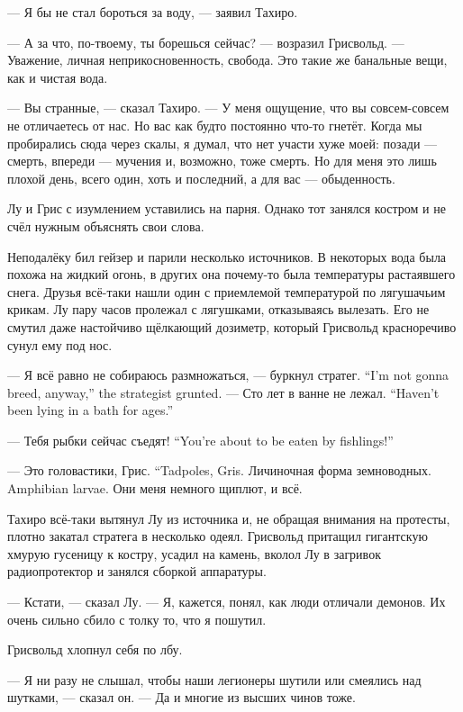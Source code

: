 --- Я бы не стал бороться за воду, --- заявил Тахиро.

--- А за что, по-твоему, ты борешься сейчас? --- возразил Грисвольд.
--- Уважение, личная неприкосновенность, свобода.
Это такие же банальные вещи, как и чистая вода.

--- Вы странные, --- сказал Тахиро.
--- У меня ощущение, что вы совсем-совсем не отличаетесь от нас.
Но вас как будто постоянно что-то гнетёт.
Когда мы пробирались сюда через скалы, я думал, что нет участи хуже моей: позади --- смерть, впереди --- мучения и, возможно, тоже смерть.
Но для меня это лишь плохой день, всего один, хоть и последний, а для вас --- обыденность.

Лу и Грис с изумлением уставились на парня.
Однако тот занялся костром и не счёл нужным объяснять свои слова.

\asterism

Неподалёку бил гейзер и парили несколько источников.
В некоторых вода была похожа на жидкий огонь, в других она почему-то была температуры растаявшего снега.
Друзья всё-таки нашли один с приемлемой температурой по лягушачьим крикам.
Лу пару часов пролежал с лягушками, отказываясь вылезать.
Его не смутил даже настойчиво щёлкающий дозиметр, который Грисвольд красноречиво сунул ему под нос.

{--- Я всё равно не собираюсь размножаться, --- буркнул стратег.}
{``I'm not gonna breed, anyway,'' the strategist grunted.}
{--- Сто лет в ванне не лежал.}
{``Haven't been lying in a bath for ages.''}

{--- Тебя рыбки сейчас съедят!}
{``You're about to be eaten by fishlings!''}

{--- Это головастики, Грис.}
{``Tadpoles, Gris.}
{Личиночная форма земноводных.}
{Amphibian larvae.}
Они меня немного щиплют, и всё.

Тахиро всё-таки вытянул Лу из источника и, не обращая внимания на протесты, плотно закатал стратега в несколько одеял.
Грисвольд притащил гигантскую хмурую гусеницу к костру, усадил на камень, вколол Лу в загривок радиопротектор и занялся сборкой аппаратуры.

--- Кстати, --- сказал Лу.
--- Я, кажется, понял, как люди отличали демонов.
Их очень сильно сбило с толку то, что я пошутил.

Грисвольд хлопнул себя по лбу.

--- Я ни разу не слышал, чтобы наши легионеры шутили или смеялись над шутками, --- сказал он.
--- Да и многие из высших чинов тоже.

